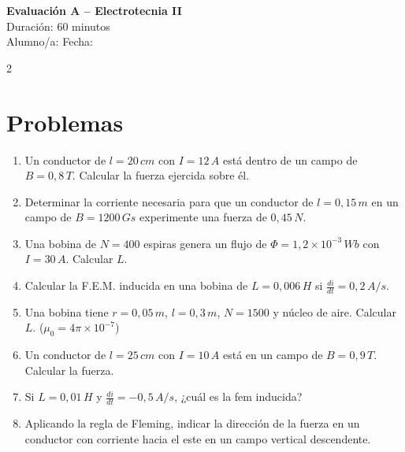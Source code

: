 \documentclass[a4paper,12pt]{article}
\begin{document}
\begin{center}
    \Large \textbf{Evaluación A – Electrotecnia II} \\
    \normalsize Duración: 60 minutos \\
    Alumno/a: \underline{\hspace{6cm}} \hspace{0.5cm} Fecha: \underline{\hspace{2cm}}
\end{center}

\vspace{0.3cm}

\begin{multicols}{2}

\section*{Problemas}

\begin{enumerate}
\item Un conductor de $l = 20\,cm$ con $I = 12\,A$ está dentro de un campo de $B = 0{,}8\,T$. Calcular la fuerza ejercida sobre él.

\item Determinar la corriente necesaria para que un conductor de $l = 0{,}15\,m$ en un campo de $B = 1200\,Gs$ experimente una fuerza de $0{,}45\,N$.

\item Una bobina de $N = 400$ espiras genera un flujo de $\Phi = 1{,}2 \times 10^{-3}\,Wb$ con $I = 30\,A$. Calcular $L$.

\item Calcular la F.E.M. inducida en una bobina de $L = 0{,}006\,H$ si $\frac{di}{dt} = 0{,}2\,A/s$.

\item Una bobina tiene $r = 0{,}05\,m$, $l = 0{,}3\,m$, $N = 1500$ y núcleo de aire. Calcular $L$. ($\mu_0 = 4\pi \times 10^{-7}$)

\item Un conductor de $l = 25\,cm$ con $I = 10\,A$ está en un campo de $B = 0{,}9\,T$. Calcular la fuerza.

\item Si $L = 0{,}01\,H$ y $\frac{di}{dt} = -0{,}5\,A/s$, ¿cuál es la fem inducida?

\item Aplicando la regla de Fleming, indicar la dirección de la fuerza en un conductor con corriente hacia el este en un campo vertical descendente.

\end{enumerate}

\end{multicols}
\end{document}
